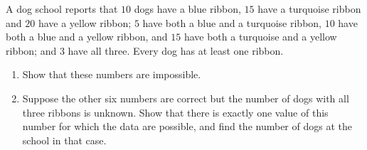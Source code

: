 A dog school reports that $10$ dogs have a blue ribbon, $15$ have a turquoise ribbon and $20$ have a yellow ribbon; $5$ have both a blue and a turquoise ribbon, $10$ have both a blue and a yellow ribbon, and $15$ have both a turquoise and a yellow ribbon; and $3$ have all three. Every dog has at least one ribbon.
\begin{enumerate}
\item[(a)] Show that these numbers are impossible.
\item[(b)] Suppose the other six numbers are correct but the number of dogs with all three ribbons is unknown. Show that there is exactly one value of this number for which the data are possible, and find the number of dogs at the school in that case.
\end{enumerate}
